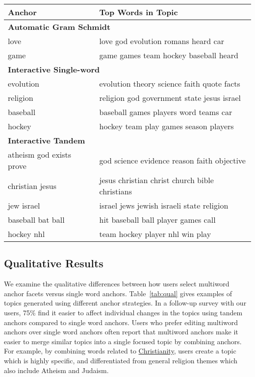 \begin{table*}[t!]
\begin{center}
\small
\begin{tabular}{p{} p{}}
\hline\hline
\bf Anchor & \bf Top Words in Topic\\\hline
\hline\multicolumn{2}{l}{\bf Automatic Gram Schmidt}\\\hline
\rowcolor{gray!35} love & love god evolution romans heard car \\
game & game games team hockey baseball heard \\
\hline\multicolumn{2}{l}{\bf Interactive Single-word}\\\hline
\rowcolor{gray!35}evolution & evolution theory science faith quote facts \\
religion & religion god government state jesus israel \\
\rowcolor{gray!35}baseball & baseball games players word teams car \\
hockey & hockey team play games season players \\
\hline\multicolumn{2}{l}{\bf Interactive Tandem}\\\hline
\rowcolor{gray!35}atheism god exists prove & god science evidence reason faith objective \\
christian jesus & jesus christian christ church bible christians \\
\rowcolor{gray!35}jew israel & israel jews jewish israeli state religion \\
baseball bat ball & hit baseball ball player games call \\
\rowcolor{gray!35}hockey nhl & team hockey player nhl win play \\
\end{tabular}
\end{center}
\caption{Comparison of topics generated for \twentynews{} using various types
of anchor words. Users combine words to create more specific
topics with tandem anchors.}
\label{tab:qual}
\end{table*}


\subsection{Qualitative Results}

We examine the qualitative differences between how users
select multiword anchor facets versus single word anchors.
Table~\ref{tab:qual} gives examples of topics generated using different
anchor strategies.
In a follow-up survey with our users, 75\% find
it easier to affect individual changes in the topics using tandem anchors
compared to single word anchors.
Users who prefer editing multiword anchors over single word anchors
often report that multiword anchors make it easier to merge similar
topics into a single focused topic by combining anchors.
For example, by combining words related to \underline{Christianity}, users create
a topic which is highly specific, and differentiated from general
religion themes which also include Atheism and Judaism.

